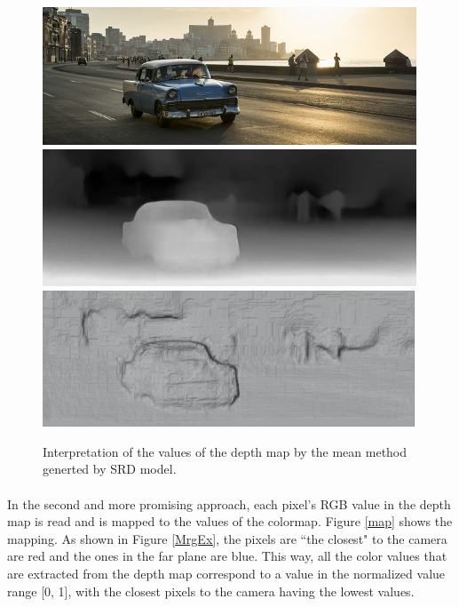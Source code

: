 \documentclass[12pt, letterpaper]{article}
\begin{document}
\begin{spacing}{1.15}
\begin{figure}[ht]
    \begin{center}
        \includegraphics[height = 4.1cm]{test_image}
        \includegraphics[height = 4.1cm]{test_disp}
        \includegraphics[height = 4.05cm]{3dtest}


        \caption{Interpretation of the values of the depth map by the mean method generted by SRD model.}
        \label{meanapproach}
    \end{center}
\end{figure}

\paragraph{}
In the second and more promising approach, each pixel's RGB value in the depth map is read and is mapped to the values of the colormap. Figure \ref{map} shows the mapping. As shown in Figure \ref{MrgEx},
the pixels are ``the closest" to the camera are red and the ones in the far plane are blue. This way, all the color values that are extracted from the depth map correspond to a value in the
normalized value range [0, 1], with the closest pixels to the camera having the lowest values.


\end{spacing}
\end{document}
